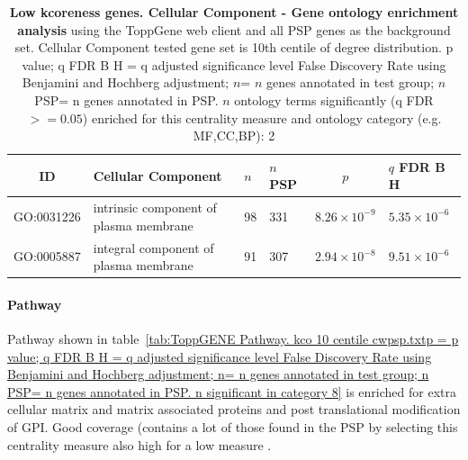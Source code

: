  \begin{table}[ht]
\centering
\begin{adjustbox}{width=\textwidth}
\setlength{\extrarowheight}{2pt}
\begin{tabular}{@{}clllcl@{}}
  \toprule
  ID & Cellular Component & $n$ & $n$ PSP & $p$ & $q$ FDR B H \\ 

  \midrule
GO:0031226 & intrinsic component of plasma membrane & 98 & 331 & $8.26 \times 10^{-9}$ & $5.35 \times 10^{-6}$ \\ 
  GO:0005887 & integral component of plasma membrane & 91 & 307 & $2.94 \times 10^{-8}$ & $9.51 \times 10^{-6}$ \\ 
   \hline
\end{tabular}
\end{adjustbox}
\caption[Gene ontology enrichment Low kcoreness genes Cellular Component of genes above 90th centile of distribution]{\textbf{Low kcoreness genes. Cellular Component - Gene ontology enrichment analysis} using the ToppGene web client and all PSP genes as the background set.  Cellular Component tested gene set is 10th centile of degree distribution.  p value; q FDR B H = q adjusted significance level False Discovery Rate using Benjamini and Hochberg adjustment; $n$= $n$ genes annotated in test group; $n$ PSP= n genes annotated in PSP. $n$ ontology terms significantly (q FDR$>=0.05$) enriched for this centrality measure and ontology category (e.g. MF,CC,BP): 2} 
\label{tab:ToppGENE GO: Cellular Component. kco 10 centile cwpsp.txtp = p value; q FDR B H = q adjusted significance level False Discovery Rate using Benjamini and Hochberg adjustment; n= n genes annotated in test group; n PSP= n genes annotated in PSP. n significant in category 2}
\end{table}

\paragraph{Pathway}

Pathway shown in table~\ref{tab:ToppGENE Pathway. kco 10 centile cwpsp.txtp = p value; q FDR B H = q adjusted significance level False Discovery Rate using Benjamini and Hochberg adjustment; n= n genes annotated in test group; n PSP= n genes annotated in PSP. n significant in category 8} is enriched for extra cellular matrix and matrix associated proteins and post translational modification of GPI. Good coverage (contains a lot of those found in the PSP by selecting this centrality measure also high for a low measure . 

